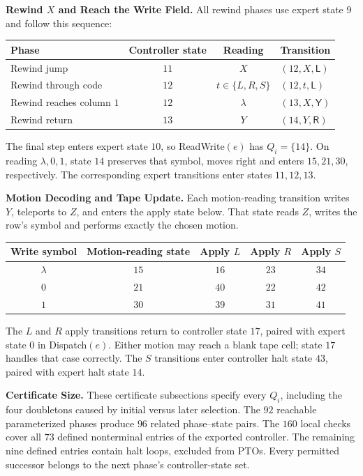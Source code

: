 \documentclass[11pt,a4paper]{article}
\newcommand{\blank}{\lambda}
\newcommand{\triple}[3]{(#1,#2,\mathsf{#3})}
\begin{document}
\textbf{Rewind $X$ and Reach the Write Field.}
All rewind phases use expert state $9$ and follow this sequence:
\begin{center}
\small\renewcommand{\arraystretch}{1.3}
\begin{tabular}{l c c l}
\toprule\rowcolor{Pale}Phase & Controller state & Reading & Transition\\\midrule
Rewind jump & $11$ & $X$ & $\triple{12}{X}{L}$\\
Rewind through code & $12$ & $t\in\{L,R,S\}$ & $\triple{12}{t}{L}$\\
Rewind reaches column $1$ & $12$ & $\blank$ & $\triple{13}{X}{Y}$\\
Rewind return & $13$ & $Y$ & $\triple{14}{Y}{R}$\\
\bottomrule
\end{tabular}
\end{center}
The final step enters expert state $10$, so ReadWrite$(e)$ has $Q_i=\{14\}$.
On reading $\blank,0,1$, state $14$ preserves that symbol, moves right and
enters $15,21,30$, respectively. The corresponding expert transitions enter states $11,12,13$.

\textbf{Motion Decoding and Tape Update.}
Each motion-reading transition writes $Y$, teleports to $Z$, and enters
the apply state below. That state reads $Z$, writes the row's symbol and
performs exactly the chosen motion.
\begin{center}
\small\renewcommand{\arraystretch}{1.35}\setlength{\tabcolsep}{10pt}
\begin{tabular}{c c ccc}
\toprule\rowcolor{Pale}Write symbol & Motion-reading state & Apply $L$ & Apply $R$ & Apply $S$\\\midrule
$\blank$ & $15$ & $16$ & $23$ & $34$\\
$0$ & $21$ & $40$ & $22$ & $42$\\
$1$ & $30$ & $39$ & $31$ & $41$\\
\bottomrule
\end{tabular}
\end{center}
The $L$ and $R$ apply transitions return to controller state $17$, paired
with expert state $0$ in Dispatch$(e)$. Either motion may reach a blank tape cell;
state $17$ handles that case correctly. The $S$ transitions enter controller
halt state $43$, paired with expert halt state $14$.

\textbf{Certificate Size.}
These certificate subsections specify every $Q_i$, including the four doubletons caused
by initial versus later selection. The $92$ reachable parameterized phases
produce $96$ related phase--state pairs. The $160$ local checks cover
all $73$ defined nonterminal entries of the exported controller.
The remaining nine defined entries contain halt loops, excluded from
PTOs. Every permitted successor belongs to the next phase's controller-state set.
\end{document}
